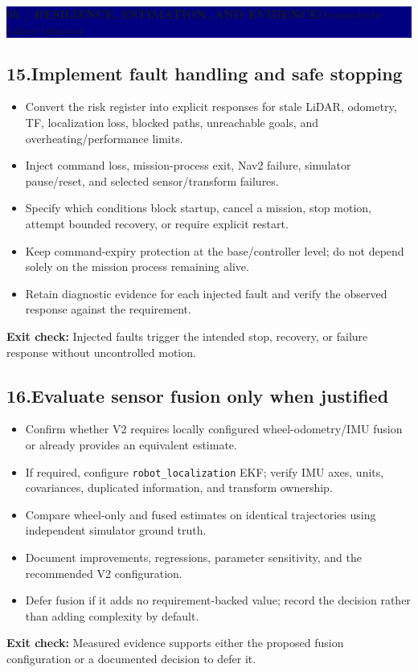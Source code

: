 \documentclass[10pt,a4paper]{article}
\newcommand{\cb}{\(\square\)}
\newcommand{\exitcheck}[1]{\vspace{2pt}\colorbox{PaleTeal}{\parbox{0.965\linewidth}{\textbf{Exit check:} #1}}}
\newcommand{\workstep}[2]{\subsection{\texorpdfstring{#1\quad #2}{#1\ #2}}}
\newcommand{\stagebanner}[2]{%
  \vspace{2pt}
  \noindent\colorbox{Navy}{\parbox{0.965\linewidth}{\color{white}\textbf{#1}\hfill #2}}
  \vspace{2pt}
}
\begin{document}
\newpage
\stagebanner{05 / RESILIENCE, ESTIMATION, AND EVIDENCE}{Demonstrate failure behavior}

\workstep{15.}{Implement fault handling and safe stopping}
\begin{itemize}
  \item[\cb] Convert the risk register into explicit responses for stale LiDAR, odometry, TF, localization loss, blocked paths, unreachable goals, and overheating/performance limits.
  \item[\cb] Inject command loss, mission-process exit, Nav2 failure, simulator pause/reset, and selected sensor/transform failures.
  \item[\cb] Specify which conditions block startup, cancel a mission, stop motion, attempt bounded recovery, or require explicit restart.
  \item[\cb] Keep command-expiry protection at the base/controller level; do not depend solely on the mission process remaining alive.
  \item[\cb] Retain diagnostic evidence for each injected fault and verify the observed response against the requirement.
\end{itemize}
\exitcheck{Injected faults trigger the intended stop, recovery, or failure response without uncontrolled motion.}

\workstep{16.}{Evaluate sensor fusion only when justified}
\begin{itemize}
  \item[\cb] Confirm whether V2 requires locally configured wheel-odometry/IMU fusion or already provides an equivalent estimate.
  \item[\cb] If required, configure \texttt{robot\_localization} EKF; verify IMU axes, units, covariances, duplicated information, and transform ownership.
  \item[\cb] Compare wheel-only and fused estimates on identical trajectories using independent simulator ground truth.
  \item[\cb] Document improvements, regressions, parameter sensitivity, and the recommended V2 configuration.
  \item[\cb] Defer fusion if it adds no requirement-backed value; record the decision rather than adding complexity by default.
\end{itemize}
\exitcheck{Measured evidence supports either the proposed fusion configuration or a documented decision to defer it.}
\end{document}
